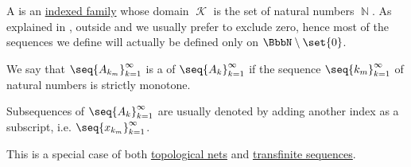 \begin{definition}\label{def:sequence}
  A  is an \hyperref[def:indexed_family]{indexed family} whose domain \( \mscrK \) is the set of natural numbers \( \BbbN \). As explained in , outside  and  we usually prefer to exclude zero, hence most of the sequences we define will actually be defined only on \( \BbbN \setminus \set{ 0 } \).

  We say that \( \seq{ A_{k_m} }_{k=1}^\infty \) is a  of \( \seq{ A_k }_{k=1}^\infty \) if the sequence \( \seq{ k_m }_{k=1}^\infty \) of natural numbers is strictly monotone.

  Subsequences of \( \seq{ A_k }_{k=1}^\infty \) are usually denoted by adding another index as a subscript, i.e. \( \seq{ x_{k_m} }_{k=1}^\infty \).

  This is a special case of both \hyperref[def:topological_net]{topological nets} and \hyperref[def:transfinite_sequence]{transfinite sequences}.
\end{definition}

